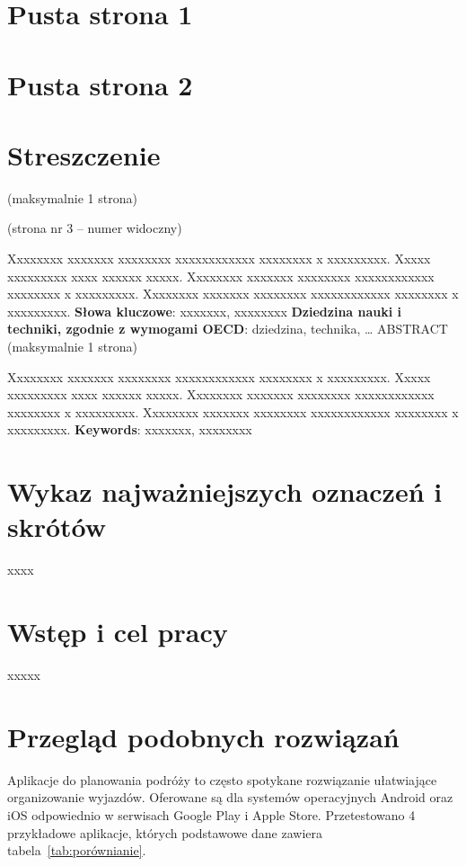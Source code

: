 \documentclass[10pt,twoside,a4paper]{report}
\begin{document}
\chapter*{Pusta strona 1}
\chapter*{Pusta strona 2}
\renewcommand{\familydefault}{\sfdefault}
\chapter*{Streszczenie}
(maksymalnie 1 strona)\par
(strona nr 3 – numer widoczny)\par
Xxxxxxxx xxxxxxx xxxxxxxx xxxxxxxxxxxx xxxxxxxx x xxxxxxxxx. Xxxxx xxxxxxxxx xxxx xxxxxx xxxxx. Xxxxxxxx xxxxxxx xxxxxxxx xxxxxxxxxxxx xxxxxxxx x xxxxxxxxx. Xxxxxxxx xxxxxxx xxxxxxxx xxxxxxxxxxxx xxxxxxxx x xxxxxxxxx. 
\newline\textbf{Słowa kluczowe}: xxxxxxx, xxxxxxxx
\newline\textbf{Dziedzina nauki i techniki, zgodnie z wymogami OECD}: 
dziedzina, technika, …
\newline ABSTRACT (maksymalnie 1 strona)
\par Xxxxxxxx xxxxxxx xxxxxxxx xxxxxxxxxxxx xxxxxxxx x xxxxxxxxx. Xxxxx xxxxxxxxx xxxx xxxxxx xxxxx. Xxxxxxxx xxxxxxx xxxxxxxx xxxxxxxxxxxx xxxxxxxx x xxxxxxxxx. Xxxxxxxx xxxxxxx xxxxxxxx xxxxxxxxxxxx xxxxxxxx x xxxxxxxxx.
\newline\textbf{Keywords}: xxxxxxx, xxxxxxxx

\tableofcontents
\chapter*{Wykaz najważniejszych oznaczeń i skrótów}
xxxx
\chapter{Wstęp i cel pracy}  
xxxxx
\chapter{Przegląd podobnych rozwiązań} 
Aplikacje do planowania podróży to często spotykane rozwiązanie ułatwiające organizowanie wyjazdów. Oferowane są dla systemów operacyjnych Android oraz iOS odpowiednio w serwisach Google Play i Apple Store. Przetestowano 4 przykładowe aplikacje, których podstawowe dane zawiera tabela~\ref{tab:porównianie}.
\end{document}
